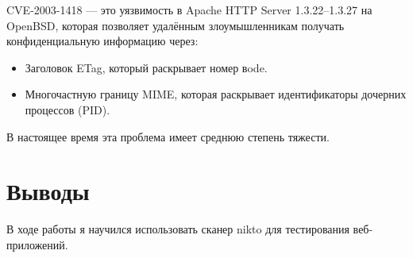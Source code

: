 \documentclass[
  english,
  russian,
  12pt,
  a4paper,
  DIV=11,
  numbers=noendperiod]{scrreprt}
\begin{document}
CVE-2003-1418 --- это уязвимость в Apache HTTP Server 1.3.22--1.3.27 на
OpenBSD, которая позволяет удалённым злоумышленникам получать
конфиденциальную информацию через:

\begin{itemize}
\item
  Заголовок ETag, который раскрывает номер вode.
\item
  Многочастную границу MIME, которая раскрывает идентификаторы дочерних
  процессов (PID).
\end{itemize}

В настоящее время эта проблема имеет среднюю степень тяжести.

\chapter{Выводы}\label{ux432ux44bux432ux43eux434ux44b}

В ходе работы я научился использовать сканер nikto для тестирования
веб-приложений.


\printbibliography
\end{document}
